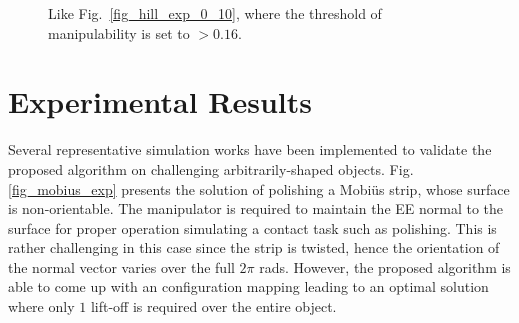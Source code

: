 \documentclass[conference]{IEEEtran}
\begin{document}
\begin{figure}[t]
\centering
{}
\caption{Like Fig.~\ref{fig_hill_exp_0_10}, where the threshold of manipulability is set to $> 0.16$. }
\label{fig_hill_exp_0_16}
\end{figure}


\section{Experimental Results}
\label{section_exp}
Several representative simulation works have been implemented to validate the proposed algorithm on challenging  arbitrarily-shaped objects.
Fig. \ref{fig_mobius_exp} presents the solution of polishing a Mobi\"{u}s strip, whose surface is non-orientable. The manipulator is required to maintain the EE normal to the surface for proper operation simulating a contact task such as polishing. This is rather challenging in this case 
since the strip is twisted, hence the orientation of the normal vector varies over the full $2\pi$ rads. However, the proposed algorithm 
is able to come up with an configuration mapping leading to an optimal solution where only $1$ lift-off is required over the entire object.
\end{document}
